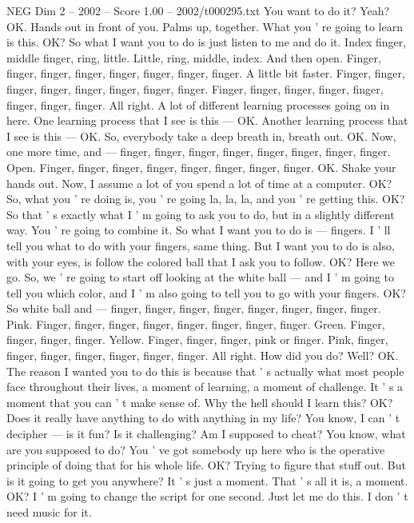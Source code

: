 \begin{textsample}{NEG Dim 2 – 2002 – Score 1.00 – 2002/t000295.txt}
You want to do it?
Yeah?
OK.
Hands out in front of you.
Palms up, together.
What you ' re going to learn is this.
OK?
So what I want you to do is just listen to me and do it.
Index finger, middle finger, ring, little.
Little, ring, middle, index.
And then open.
Finger, finger, finger, finger, finger, finger, finger, finger.
A little bit faster.
Finger, finger, finger, finger, finger, finger, finger, finger.
Finger, finger, finger, finger, finger, finger, finger, finger.
All right.
A lot of different learning processes going on in here.
One learning process that I see is this — OK.
Another learning process that I see is this — OK.
So, everybody take a deep breath in, breath out.
OK.
Now, one more time, and — finger, finger, finger, finger, finger, finger, finger, finger.
Open.
Finger, finger, finger, finger, finger, finger, finger, finger.
OK.
Shake your hands out.
Now, I assume a lot of you spend a lot of time at a computer.
OK?
So, what you ' re doing is, you ' re going la, la, la, and you ' re getting this.
OK?
So that ' s exactly what I ' m going to ask you to do, but in a slightly different way.
You ' re going to combine it.
So what I want you to do is — fingers.
I ' ll tell you what to do with your fingers, same thing.
But I want you to do is also, with your eyes, is follow the colored ball that I ask you to follow.
OK?
Here we go.
So, we ' re going to start off looking at the white ball — and I ' m going to tell you which color, and I ' m also going to tell you to go with your fingers.
OK?
So white ball and — finger, finger, finger, finger, finger, finger, finger, finger.
Pink.
Finger, finger, finger, finger, finger, finger, finger, finger.
Green.
Finger, finger, finger, finger.
Yellow.
Finger, finger, finger, pink or finger.
Pink, finger, finger, finger, finger, finger, finger, finger.
All right.
How did you do?
Well?
OK.
The reason I wanted you to do this is because that ' s actually what most people face throughout their lives, a moment of learning, a moment of challenge.
It ' s a moment that you can ' t make sense of.
Why the hell should I learn this?
OK?
Does it really have anything to do with anything in my life?
You know, I can ' t decipher — is it fun?
Is it challenging?
Am I supposed to cheat?
You know, what are you supposed to do?
You ' ve got somebody up here who is the operative principle of doing that for his whole life.
OK?
Trying to figure that stuff out.
But is it going to get you anywhere?
It ' s just a moment.
That ' s all it is, a moment.
OK?
I ' m going to change the script for one second.
Just let me do this.
I don ' t need music for it.

\end{textsample}
